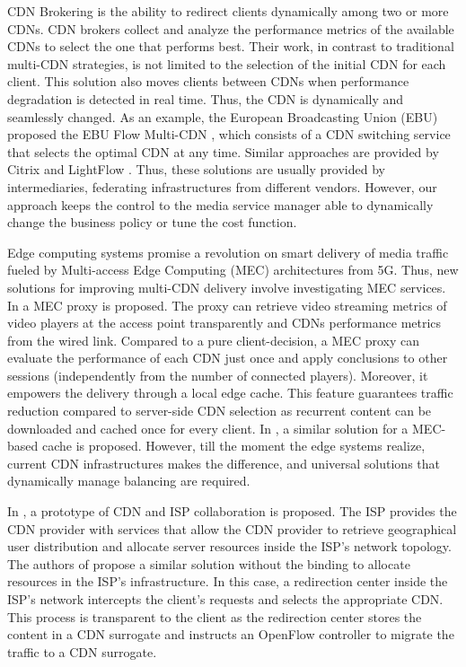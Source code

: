 CDN Brokering \cite{biliris2002} is the ability to redirect clients dynamically among two or more CDNs. CDN brokers collect and analyze the performance metrics of the available CDNs to select the one that performs best. Their work, in contrast to traditional multi-CDN strategies, is not limited to the selection of the initial CDN for each client. This solution also moves clients between CDNs when performance degradation is detected in real time. Thus, the CDN is dynamically and seamlessly changed. As an example, the European Broadcasting Union (EBU) proposed the EBU Flow Multi-CDN \cite{EurovisionFLOW}, which consists of a CDN switching service that selects the optimal CDN at any time. Similar approaches are provided by Citrix \cite{citrix2} and LightFlow \cite{lightflow}. Thus, these solutions are usually provided by intermediaries, federating infrastructures from different vendors. However, our approach keeps the control to the media service manager able to dynamically change the business policy or tune the cost function.

Edge computing systems promise a revolution on smart delivery of media traffic fueled by Multi-access Edge Computing (MEC) \cite{etsi2019} architectures from 5G.
Thus, new solutions for improving multi-CDN delivery involve investigating MEC services. In \cite{viola2018} a MEC proxy is proposed. The proxy can retrieve video streaming metrics of video players at the access point transparently and CDNs performance metrics from the wired link. Compared to a pure client-decision, a MEC proxy can evaluate the performance of each CDN just once and apply conclusions to other sessions (independently from the number of connected players). Moreover, it empowers the delivery through a local edge cache. This feature guarantees traffic reduction compared to server-side CDN selection as recurrent content can be downloaded and cached once for every client. In \cite{carrozzo2018}, a similar solution for a MEC-based cache is proposed.
However, till the moment the edge systems realize, current CDN infrastructures makes the difference, and universal solutions that dynamically manage balancing are required.

In \cite{frank2013}, a prototype of CDN and ISP collaboration is proposed. The ISP provides the CDN provider with services that allow the CDN provider to retrieve geographical user distribution and allocate server resources inside the ISP's network topology. The authors of \cite{wichtlhuber2015} propose a similar solution without the binding to allocate resources in the ISP's infrastructure. In this case, a redirection center inside the ISP's network intercepts the client’s requests and selects the appropriate CDN. This process is transparent to the client as the redirection center stores the content in a CDN surrogate and instructs an OpenFlow controller to migrate the traffic to a CDN surrogate.

